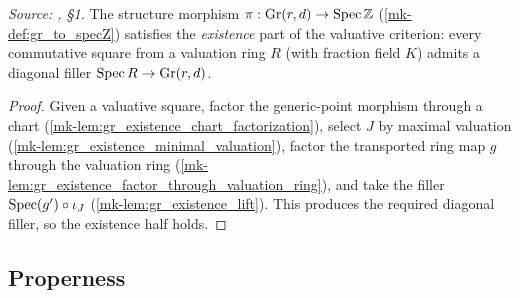 \begin{lemma}\label{mk-lem:gr_valuativeExistence_toSpecZ}
  \leanok

  \textit{Source: \cite{nitsure-hilbert-quot}, \S 1.}
  The structure morphism \(\pi : \mathrm{Gr}(r,d) \to \operatorname{Spec} \mathbb{Z}\)
  (\ref{mk-def:gr_to_specZ}) satisfies the \emph{existence} part of the valuative
  criterion: every commutative square from a valuation ring \(R\) (with fraction
  field \(K\)) admits a diagonal filler \(\operatorname{Spec} R \to \mathrm{Gr}(r,d)\).
\end{lemma}
\begin{proof}
  \leanok
    Given a valuative square, factor the generic-point morphism through a chart
  (\ref{mk-lem:gr_existence_chart_factorization}), select \(J\) by maximal valuation
  (\ref{mk-lem:gr_existence_minimal_valuation}), factor the transported ring map
  \(g\) through the valuation ring (\ref{mk-lem:gr_existence_factor_through_valuation_ring}),
  and take the filler \(\operatorname{Spec}(g') \circ \iota_J\)
  (\ref{mk-lem:gr_existence_lift}). This produces the required diagonal filler, so the
  existence half holds.
\end{proof}

\subsection*{Properness}

